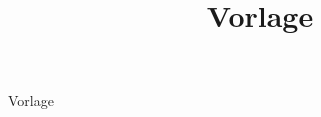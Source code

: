 \documentclass[parskip=full]{scrartcl}
\title{Vorlage}
\begin{document}
\maketitle
\newpage
Vorlage
\end{document}
